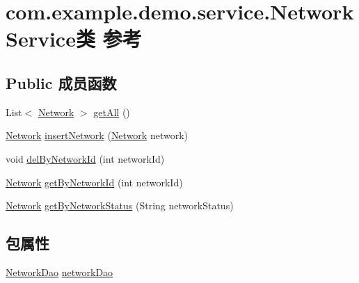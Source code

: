 \hypertarget{classcom_1_1example_1_1demo_1_1service_1_1_network_service}{}\section{com.\+example.\+demo.\+service.\+Network\+Service类 参考}
\label{classcom_1_1example_1_1demo_1_1service_1_1_network_service}
\subsection*{Public 成员函数}
\begin{DoxyCompactItemize}
\item 
List$<$ \mbox{\hyperlink{classcom_1_1example_1_1demo_1_1modular_1_1_network}{Network}} $>$ \mbox{\hyperlink{classcom_1_1example_1_1demo_1_1service_1_1_network_service_ac2700574f44e100a2352a535d78adcae}{get\+All}} ()
\item 
\mbox{\hyperlink{classcom_1_1example_1_1demo_1_1modular_1_1_network}{Network}} \mbox{\hyperlink{classcom_1_1example_1_1demo_1_1service_1_1_network_service_a5fb1c25ef8943ce2dee62266c6ca9068}{insert\+Network}} (\mbox{\hyperlink{classcom_1_1example_1_1demo_1_1modular_1_1_network}{Network}} network)
\item 
void \mbox{\hyperlink{classcom_1_1example_1_1demo_1_1service_1_1_network_service_aceb2c5ffed18a44d54d23d3e9fa2b872}{del\+By\+Network\+Id}} (int network\+Id)
\item 
\mbox{\hyperlink{classcom_1_1example_1_1demo_1_1modular_1_1_network}{Network}} \mbox{\hyperlink{classcom_1_1example_1_1demo_1_1service_1_1_network_service_ad553c54f5e8788d35950357919bf24d4}{get\+By\+Network\+Id}} (int network\+Id)
\item 
\mbox{\hyperlink{classcom_1_1example_1_1demo_1_1modular_1_1_network}{Network}} \mbox{\hyperlink{classcom_1_1example_1_1demo_1_1service_1_1_network_service_a532bf50eb10532dadc9f2a0644d319ae}{get\+By\+Network\+Status}} (String network\+Status)
\end{DoxyCompactItemize}
\subsection*{包属性}
\begin{DoxyCompactItemize}
\item 
\mbox{\hyperlink{interfacecom_1_1example_1_1demo_1_1dao_1_1_network_dao}{Network\+Dao}} \mbox{\hyperlink{classcom_1_1example_1_1demo_1_1service_1_1_network_service_ad2a9991e6c106b0be28b3db5ade2faac}{network\+Dao}}
\end{DoxyCompactItemize}


